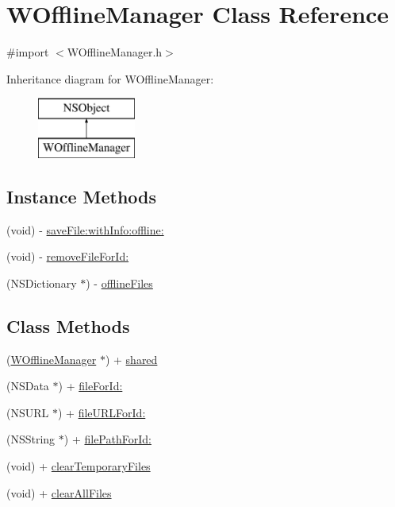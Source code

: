 \hypertarget{interface_w_offline_manager}{\section{W\-Offline\-Manager Class Reference}
\label{interface_w_offline_manager}
}


{\ttfamily \#import $<$W\-Offline\-Manager.\-h$>$}

Inheritance diagram for W\-Offline\-Manager\-:\begin{figure}[H]
\begin{center}
\leavevmode
\includegraphics[height=2.000000cm]{interface_w_offline_manager}
\end{center}
\end{figure}
\subsection*{Instance Methods}
\begin{DoxyCompactItemize}
\item 
(void) -\/ \hyperlink{interface_w_offline_manager_ac037f9e5f784ba72b6e3e85cbdcf0f56}{save\-File\-:with\-Info\-:offline\-:}
\item 
(void) -\/ \hyperlink{interface_w_offline_manager_a9681c1c8b70f002f544f7a1acf72a3fb}{remove\-File\-For\-Id\-:}
\item 
(N\-S\-Dictionary $\ast$) -\/ \hyperlink{interface_w_offline_manager_ae19a74e09536de647f30c3899d259942}{offline\-Files}
\end{DoxyCompactItemize}
\subsection*{Class Methods}
\begin{DoxyCompactItemize}
\item 
(\hyperlink{interface_w_offline_manager}{W\-Offline\-Manager} $\ast$) + \hyperlink{interface_w_offline_manager_aea407c39d43f5a2a9429b715cf8dc36c}{shared}
\item 
(N\-S\-Data $\ast$) + \hyperlink{interface_w_offline_manager_a2e524e162ac1ca3b3808cb1c35db72cf}{file\-For\-Id\-:}
\item 
(N\-S\-U\-R\-L $\ast$) + \hyperlink{interface_w_offline_manager_a0a79cf5ec6a6c68c2ae568c659364c1c}{file\-U\-R\-L\-For\-Id\-:}
\item 
(N\-S\-String $\ast$) + \hyperlink{interface_w_offline_manager_a0448088aa44d7ce595d5da5b60de4adf}{file\-Path\-For\-Id\-:}
\item 
(void) + \hyperlink{interface_w_offline_manager_ae102ccd2cffe01fe1ada42bf74799f29}{clear\-Temporary\-Files}
\item 
(void) + \hyperlink{interface_w_offline_manager_a229eb4c284da7f8c57a03ec2261f6f6c}{clear\-All\-Files}
\end{DoxyCompactItemize}


